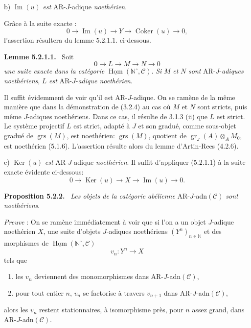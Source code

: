 \documentclass[11pt]{article}
\newenvironment{statement}[1]{\par\medskip\noindent\textbf{#1.}\ }{\par\medskip}
\DeclareMathOperator{\Hom}{Hom}
\providecommand{\Ker}{\operatorname{Ker}}
\providecommand{\Coker}{\operatorname{Coker}}
\providecommand{\uHom}{\underline{\Hom}}
\providecommand{\gr}{\operatorname{gr}}
\providecommand{\Hom}{\operatorname{Hom}}
\providecommand{\Im}{\operatorname{Im}}
\providecommand{\Ker}{\operatorname{Ker}}
\providecommand{\Coker}{\operatorname{Coker}}
\providecommand{\gr}{\operatorname{gr}}
\renewcommand{\Im}{\operatorname{Im}}
\providecommand{\gr}{\operatorname{gr}}
\providecommand{\grs}{\operatorname{grs}}
\providecommand{\Ker}{\operatorname{Ker}}
\providecommand{\Coker}{\operatorname{Coker}}
\providecommand{\Im}{\operatorname{Im}}
\providecommand{\Hom}{\operatorname{Hom}}
\begin{document}
b) \(\Im(u)\) \emph{est} AR-\(J\)-adique \emph{noethérien}.

Grâce à la suite exacte :
\[
0\longrightarrow \Im(u)\longrightarrow Y\longrightarrow \Coker(u)\longrightarrow 0,
\]
l'assertion résultera du lemme 5.2.1.1. ci-dessous.

\begin{statement}{Lemme 5.2.1.1}
Soit
\[
0\longrightarrow L\longrightarrow M\longrightarrow N\longrightarrow0
\]
\emph{une suite exacte dans la catégorie} \(\uHom(\mathbb N^\circ,\mathcal C)\). \emph{Si} \(M\) \emph{et} \(N\) \emph{sont} AR-\(J\)-\emph{adiques noethériens}, \(L\) \emph{est} AR-\(J\)-\emph{adique noethérien}.
\end{statement}

Il suffit évidemment de voir qu'il est AR-\(J\)-adique. On se ramène de la même manière que dans la démonstration de (3.2.4) au cas où \(M\) et \(N\) sont stricts, puis même \(J\)-adiques noethériens. Dans ce cas, il résulte de 3.1.3 (ii) que \(L\) est strict. Le système projectif \(L\) est strict, adapté à \(J\) et son gradué, comme sous-objet gradué de \(\grs(M)\), est noethérien: \(\grs(M)\), quotient de \(\gr_J(A)\otimes_A M_0\), est noethérien (5.1.6). L'assertion résulte alors du lemme d'Artin-Rees (4.2.6).

c) \(\Ker(u)\) \emph{est} AR-\(J\)-adique \emph{noethérien}. Il suffit d'appliquer (5.2.1.1) à la suite exacte évidente ci-dessous:
\[
0\longrightarrow \Ker(u)\longrightarrow X\longrightarrow \Im(u)\longrightarrow0.
\]

\begin{statement}{Proposition 5.2.2}
\emph{Les objets de la catégorie abélienne} AR-\(J\)-adn\((\mathcal C)\) \emph{sont noethériens}.
\end{statement}

\emph{Preuve} : On se ramène immédiatement à voir que si l'on a un objet \(J\)-adique noethérien \(X\), une suite d'objets \(J\)-adiques noethériens \((Y^n)_{n\in\mathbb N}\) et des morphismes de \(\uHom(\mathbb N^\circ,\mathcal C)\)
\[
v_n:Y^n\longrightarrow X
\]
tels que
\begin{enumerate}[label=\textup{(\roman*)}]
\item les \(v_n\) deviennent des monomorphismes dans AR-\(J\)-adn\((\mathcal C)\),
\item pour tout entier \(n\), \(v_n\) se factorise à travers \(v_{n+1}\) dans AR-\(J\)-adn\((\mathcal C)\),
\end{enumerate}
alors les \(v_n\) restent stationnaires, à isomorphisme près, pour \(n\) assez grand, dans AR-\(J\)-adn\((\mathcal C)\).
\end{document}
